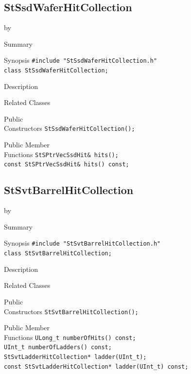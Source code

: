 \documentclass[twoside]{article}
\newcommand{\entrylabel}[1]{\mbox{\textbf{{#1}}}\hfil}%
\newenvironment{entry}
{\begin{list}{}%
    {\renewcommand{\makelabel}{\entrylabel}%
     \setlength{\labelwidth}{90pt}%
     \setlength{\leftmargin}{\labelwidth}
     \advance\leftmargin by \labelsep%
      }%
    }%
  {\end{list}}
\newcommand{\Entrylabel}[1]%
{\raisebox{0pt}[1ex][0pt]{\makebox[\labelwidth][l]%
    {\parbox[t]{\labelwidth}{\hspace{0pt}\textbf{{#1}}}}}}
\newenvironment{Entry}%
{\renewcommand{\entrylabel}{\Entrylabel}\begin{entry}}%
  {\end{entry}}
\begin{document}
\subsection{StSsdWaferHitCollection}
\label{sec:StSsdWaferHitCollection}
\begin{Entry}
\item[Summary]
\item[Synopsis]
    \verb+#include "StSsdWaferHitCollection.h"+\\
    \verb+class StSsdWaferHitCollection;+\\
\item[Description]
\item[Related Classes]
\item[Public\\ Constructors]
    \verb+StSsdWaferHitCollection();+\\
\item[Public Member\\ Functions]
    \verb+StSPtrVecSsdHit& hits();+\\
    \verb+const StSPtrVecSsdHit& hits() const;+\\
\end{Entry}
\clearpage

\subsection{StSvtBarrelHitCollection}
\label{sec:StSvtBarrelHitCollection}
\begin{Entry}
\item[Summary]
\item[Synopsis]
    \verb+#include "StSvtBarrelHitCollection.h"+\\
    \verb+class StSvtBarrelHitCollection;+\\
\item[Description]
\item[Related Classes]
\item[Public\\ Constructors]
    \verb+StSvtBarrelHitCollection();+\\
\item[Public Member\\ Functions]
    \verb+ULong_t numberOfHits() const;+\\
    \verb+UInt_t numberOfLadders() const;+\\
    \verb+StSvtLadderHitCollection* ladder(UInt_t);+\\
    \verb+const StSvtLadderHitCollection* ladder(UInt_t) const;+\\
\end{Entry}
\clearpage
\end{document}
